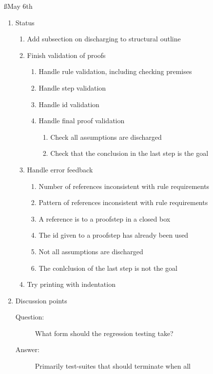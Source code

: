 \documentclass[a4paper]{article}
\begin{document}
\ss{May 6th}
\begin{enumerate}
  \item Status
    \begin{enumerate}[\HollowBox]
      \item[\Checkedbox] Add subsection on discharging to structural outline
      \item Finish validation of proofs
        \begin{enumerate}[\HollowBox]
          \item Handle rule validation, including checking premises
          \item Handle step validation
          \item[\Checkedbox] Handle id validation
          \item[\Checkedbox] Handle final proof validation
            \begin{enumerate}[\HollowBox]
              \item[\Checkedbox] Check all assumptions are discharged
              \item[\Checkedbox] Check that the conclusion in the last step
              is the goal
            \end{enumerate}
        \end{enumerate}
      \item Handle error feedback
        \begin{enumerate}[\HollowBox]
          \item Number of references inconsistent with rule requirements
          \item Pattern of references inconsistent with rule requirements
          \item A reference is to a proofstep in a closed box
          \item[\Checkedbox] The id given to a proofstep has already been 
          used
          \item[\Checkedbox] Not all assumptions are discharged
          \item[\Checkedbox] The conlclusion of the last step is not the goal
        \end{enumerate}
      \item Try printing with indentation
    \end{enumerate}
  \item Discussion points
    \begin{description}
      \item[Question:] What form should the regression testing take?
      \item[Answer:] Primarily test-suites that should terminate when all

\end{description}
\end{enumerate}
\end{document}
